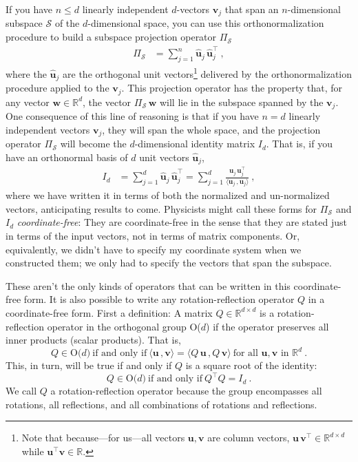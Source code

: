 \documentclass{article}
\newcommand{\Evec}[1]{{\mathbf{#1}}} %
\newcommand{\Ehat}[1]{{\mathbf{\hat{#1}}}} %
\newcommand{\inner}[2]{\langle{#1}\,,{#2}\rangle}
\begin{document}
If you have $n\leq d$ linearly independent $d$-vectors $\Evec{v}_j$ that span an $n$-dimensional subspace $\mathscr{S}$ of the $d$-dimensional space, you can use this orthonormalization procedure to build a subspace projection operator $\Pi_\mathscr{S}$
\begin{align}\label{eq:oproj}
    \Pi_\mathscr{S} &= \sum_{j=1}^n \Ehat{u}_j\,\Ehat{u}_j^\top ~,
\end{align}
where the $\Ehat{u}_j$ are the orthogonal unit vectors\footnote{Note that because---for us---all vectors $\Evec{u},\Evec{v}$ are column vectors, $\Evec{u}\,\Evec{v}^\top\in\mathbb{R}^{d\times d}$ while $\Evec{u}^\top \Evec{v}\in\mathbb{R}$.} delivered by the orthonormalization procedure applied to the $\Evec{v}_j$.
This projection operator has the property that, for any vector $\Evec{w}\in\mathbb{R}^d$, the vector $\Pi_\mathscr{S}\,\Evec{w}$ will lie in the subspace spanned by the $\Evec{v}_j$.
One consequence of this line of reasoning is that if you have $n=d$ linearly independent vectors $\Evec{v}_j$, they will span the whole space, and the projection operator $\Pi_\mathscr{S}$ will become the $d$-dimensional identity matrix $I_d$.
That is, if you have an orthonormal basis of $d$ unit vectors $\Ehat{u}_j$,
\begin{align}\label{eq:oI}
    I_d &= \sum_{j=1}^d \Ehat{u}_j\,\Ehat{u}_j^\top = \sum_{j=1}^d \frac{\Evec{u}_j\,\Evec{u}_j^\top}{\inner{\Evec{u}_j}{\Evec{u}_j}} ~,
\end{align}
where we have written it in terms of both the normalized and un-normalized vectors, anticipating results to come.
Physicists might call these forms for $\Pi_\mathscr{S}$ and $I_d$ \emph{coordinate-free}:
They are coordinate-free in the sense that they are stated just in terms of the input vectors, not in terms of matrix components.
Or, equivalently, we didn't have to specify my coordinate system when we constructed them; we only had to specify the vectors that span the subspace.

These aren't the only kinds of operators that can be written in this coordinate-free form.
It is also possible to write any rotation-reflection operator $Q$ in a coordinate-free form.
First a definition: A matrix $Q\in\mathbb{R}^{d\times d}$ is a rotation-reflection operator in the orthogonal group O($d$) if the operator preserves all inner products (scalar products).
That is,
\begin{equation}
    Q \in \mbox{O($d$)} ~ \mbox{if and only if} ~ \inner{\Evec{u}}{\Evec{v}}=\inner{Q\,\Evec{u}}{Q\,\Evec{v}} ~ \mbox{for all $\Evec{u},\Evec{v}$ in $\mathbb{R}^d$} ~.\label{eq:orth1}
\end{equation}
This, in turn, will be true if and only if $Q$ is a square root of the identity:
\begin{equation}
    Q \in \mbox{O($d$)} ~ \mbox{if and only if} ~ Q^\top Q=I_d ~.\label{eq:orth2}
\end{equation}
We call $Q$ a rotation-reflection operator because the group encompasses all rotations, all reflections, and all combinations of rotations and reflections.
\end{document}
